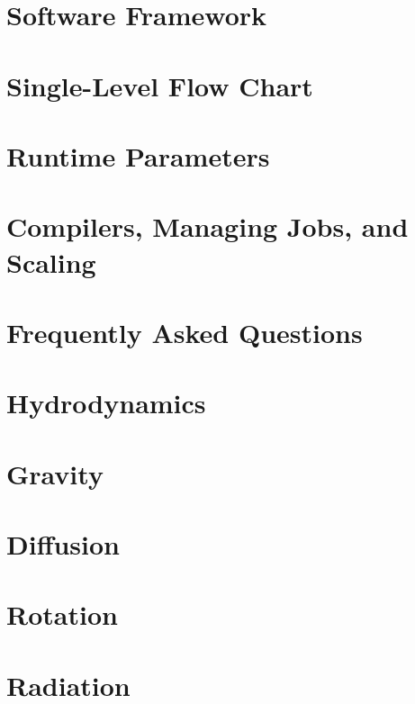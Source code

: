 \documentclass[11pt]{book}
\begin{document}
\chapter{Software Framework}


\chapter{Single-Level Flow Chart}


\chapter{Runtime Parameters}



\chapter{Compilers, Managing Jobs, and Scaling}


\chapter{Frequently Asked Questions}


\chapter{Hydrodynamics}


\chapter{Gravity}


\chapter{Diffusion}


\chapter{Rotation}


\chapter{Radiation}

\end{document}
